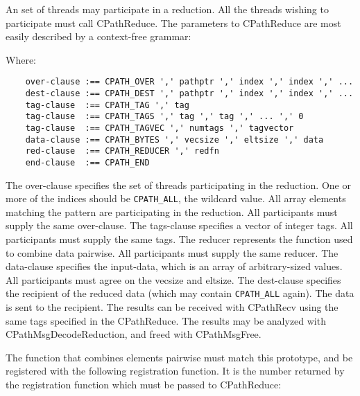 An set of threads may participate in a reduction.  All the threads
wishing to participate must call CPathReduce.  The parameters to
CPathReduce are most easily described by a context-free grammar:

Where:

\begin{verbatim}
    over-clause :== CPATH_OVER ',' pathptr ',' index ',' index ',' ...
    dest-clause :== CPATH_DEST ',' pathptr ',' index ',' index ',' ...
    tag-clause  :== CPATH_TAG ',' tag
    tag-clause  :== CPATH_TAGS ',' tag ',' tag ',' ... ',' 0
    tag-clause  :== CPATH_TAGVEC ',' numtags ',' tagvector
    data-clause :== CPATH_BYTES ',' vecsize ',' eltsize ',' data
    red-clause  :== CPATH_REDUCER ',' redfn
    end-clause  :== CPATH_END
\end{verbatim}

The over-clause specifies the set of threads participating in the
reduction.  One or more of the indices should be {\tt CPATH\_ALL}, the
wildcard value.  All array elements matching the pattern are
participating in the reduction.  All participants must supply the same
over-clause.  The tags-clause specifies a vector of integer tags. All
participants must supply the same tags.  The reducer represents the
function used to combine data pairwise.  All participants must supply
the same reducer.  The data-clause specifies the input-data, which is
an array of arbitrary-sized values.  All participants must agree on
the vecsize and eltsize.  The dest-clause specifies the recipient of
the reduced data (which may contain {\tt CPATH\_ALL} again).  The data
is sent to the recipient.  The results can be received with CPathRecv
using the same tags specified in the CPathReduce.  The results may be
analyzed with CPathMsgDecodeReduction, and freed with CPathMsgFree.


The function that combines elements pairwise must match this
prototype, and be registered with the following registration function.
It is the number returned by the registration function which must be
passed to CPathReduce:



